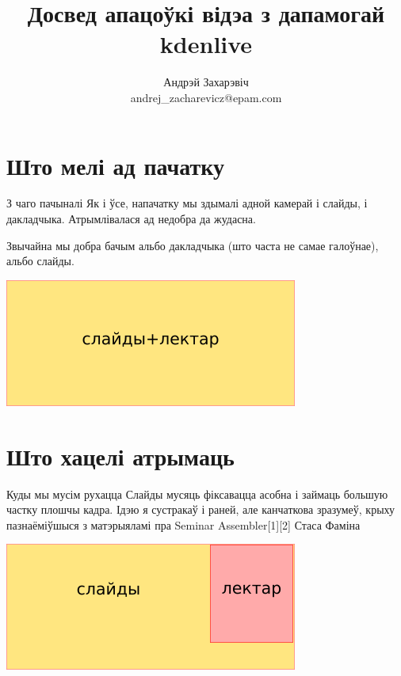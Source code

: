 \documentclass[ignorenonframetext,hyperref={pdftex,unicode}]{beamer}
\title{Досвед апацоўкі відэа з дапамогай kdenlive}
\author[Андрэй Захарэвіч]{Андрэй Захарэвіч\\ andrej\_zacharevicz@epam.com}
\begin{document}
\frame{\titlepage} 


\section{Што мелі ад пачатку} 

\begin{frame}{З чаго пачыналі} 
	Як і ўсе, напачатку мы здымалі адной камерай і слайды, і дакладчыка. Атрымлівалася ад недобра да жудасна.

	Звычайна мы добра бачым альбо дакладчыка (што часта не самае галоўнае), альбо слайды.
	\begin{center}
 		\includegraphics[height=0.5\textheight,keepaspectratio]{1}		
	\end{center}
\end{frame}

\section{Што хацелі атрымаць} 

\begin{frame}{Куды мы мусім рухацца} 
	Слайды мусяць фіксавацца асобна і займаць большую частку плошчы кадра. Ідэю я сустракаў і раней, але канчаткова зразумеў, крыху пазнаёміўшыся з матэрыяламі пра Seminar Assembler[1][2] Стаса Фаміна
	\begin{center}
 		\includegraphics[height=0.5\textheight,keepaspectratio]{2}		
	\end{center}
\end{frame}
\end{document}
